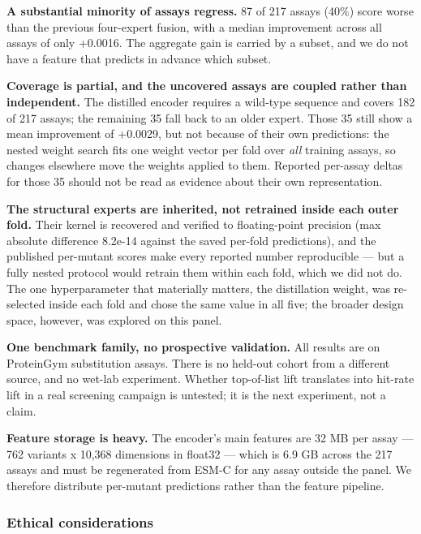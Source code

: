 \textbf{A substantial minority of assays regress.} 87 of 217 assays (40\%) score worse than the previous
four-expert fusion, with a median improvement across all assays of only +0.0016. The aggregate gain is
carried by a subset, and we do not have a feature that predicts in advance which subset.

\textbf{Coverage is partial, and the uncovered assays are coupled rather than independent.} The distilled
encoder requires a wild-type sequence and covers 182 of 217 assays; the remaining 35 fall back to an
older expert. Those 35 still show a mean improvement of +0.0029, but not because of their own
predictions: the nested weight search fits one weight vector per fold over \emph{all} training assays, so
changes elsewhere move the weights applied to them. Reported per-assay deltas for those 35 should not
be read as evidence about their own representation.

\textbf{The structural experts are inherited, not retrained inside each outer fold.} Their kernel is
recovered and verified to floating-point precision (max absolute difference 8.2e-14 against the saved
per-fold predictions), and the published per-mutant scores make every reported number reproducible ---
but a fully nested protocol would retrain them within each fold, which we did not do. The one
hyperparameter that materially matters, the distillation weight, was re-selected inside each fold and
chose the same value in all five; the broader design space, however, was explored on this panel.

\textbf{One benchmark family, no prospective validation.} All results are on ProteinGym substitution
assays. There is no held-out cohort from a different source, and no wet-lab experiment. Whether
top-of-list lift translates into hit-rate lift in a real screening campaign is untested; it is the
next experiment, not a claim.

\textbf{Feature storage is heavy.} The encoder's main features are 32 MB per assay --- 762 variants x 10,368
dimensions in float32 --- which is 6.9 GB across the 217 assays and must be regenerated from ESM-C for
any assay outside the panel. We therefore distribute per-mutant predictions rather than the feature
pipeline.

\hypertarget{ethical-considerations}{%
\subsubsection{Ethical considerations}\label{ethical-considerations}}

